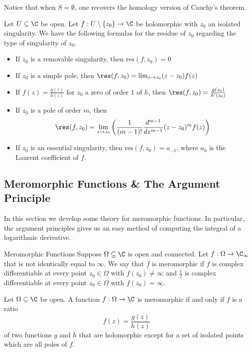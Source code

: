 \documentclass[a4paper]{article}
\begin{document}
Notice that when $S=\emptyset$, one recovers the homology version of Cauchy's theorem. 

\begin{prp}{}{} Let $U\subseteq\C$ be open. Let $f:U\setminus\{z_0\}\to\C$ be holomorphic with $z_0$ an isolated singularity. We have the following formulas for the residue of $z_0$ regarding the type of singularity of $z_0$. 
\begin{itemize}
\item If $z_0$ is a removable singularity, then $\text{res}(f,z_0)=0$
\item If $z_0$ is a simple pole, then $\res(f,z_0)=\lim_{z\to z_0}(z-z_0)f(z)$
\item If $f(z)=\frac{g(z)}{h(z)}$ for $z_0$ a zero of order $1$ of $h$, then $\res(f,z_0)=\frac{g(z_0)}{h'(z_0)}$
\item If $z_0$ is a pole of order $m$, then $$\res(f,z_0)=\lim_{z\to z_0}\left(\frac{1}{(m-1)!}\frac{d^{m-1}}{dz^{m-1}}(z-z_0)^mf(z)\right)$$
\item If $z_0$ is an essential singularity, then $\text{res}(f,z_0)=a_{-1}$, where $a_k$ is the Laurent coefficient of $f$. 
\end{itemize}
\end{prp}

\subsection{Meromorphic Functions \& The Argument Principle}
In this section we develop some theory for meromorphic functions. In particular, the argument principles gives us an easy method of computing the integral of a logarithmic derivative. 

\begin{defn}{Meromorphic Functions}{} Suppose $\Omega\subseteq\C$ is open and connected. Let $f:\Omega\to\C_{\infty}$ that is not identically equal to $\infty$. We say that $f$ is meromorphic if $f$ is complex differentiable at every point $z_0\in\Omega$ with $f(z_0)\neq\infty$ and $\frac{1}{f}$ is complex differentiable at every point $z_0\in\Omega$ with $f(z_0)=\infty$. 
\end{defn}

\begin{lmm}{}{} Let $\Omega\subseteq\C$ be open. A function $f:\Omega\to\C$ is meromorphic if and only if $f$ is a ratio $$f(z)=\frac{g(z)}{h(z)}$$ of two functions $g$ and $h$ that are holomorphic except for a set of isolated points which are all poles of $f$. 
\end{lmm}
\end{document}
